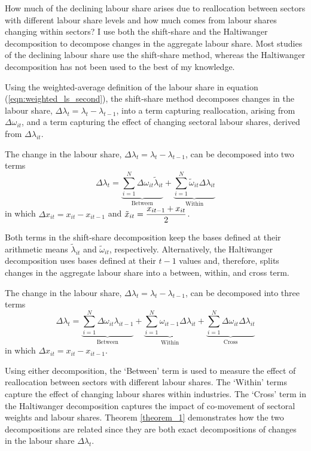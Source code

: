 How much of the declining labour share arises due to reallocation between sectors with different labour share levels and how much comes from labour shares changing within sectors? I use both the shift-share and the Haltiwanger decomposition to decompose changes in the aggregate labour share. Most studies of the declining labour share use the shift-share method, whereas the Haltiwanger decomposition has not been used to the best of my knowledge.  

Using the weighted-average definition of the labour share in equation (\ref{eqn:weighted_ls_second}), the shift-share method decomposes changes in the labour share, $\Delta \lambda_{t} = \lambda_{t} - \lambda_{t-1}$, into a term capturing reallocation, arising from $\Delta\omega_{it}$, and a term capturing the effect of changing sectoral labour shares, derived from $\Delta\lambda_{it}$.
\begin{definition}
    The change in the labour share, $\Delta \lambda_{t} = \lambda_{t} - \lambda_{t-1}$, can be decomposed into two terms
    \begin{equation}
        \Delta \lambda_{t} = \underbrace{\sum_{i=1}^{N}\Delta\omega_{it}\tilde{\lambda}_{it}}_\text{Between} + \underbrace{\sum_{i=1}^{N}\tilde{\omega}_{it}\Delta\lambda_{it}}_\text{Within} 
    \label{eqn:shift_share_decomposition}
    \end{equation}    
    in which $\Delta x_{it} = x_{it} - x_{it-1}$ and $\tilde{x}_{it} = {\displaystyle\frac{\displaystyle x_{it-1} + x_{it}}{\displaystyle 2}}$.
\end{definition}
\noindent Both terms in the shift-share decomposition keep the bases defined at their arithmetic means $\tilde{\lambda}_{it}$ and $\tilde{\omega}_{it}$, respectively. Alternatively, the Haltiwanger decomposition uses bases defined at their $t-1$ values and, therefore, splits changes in the aggregate labour share into a between, within, and cross term. 

\begin{definition}
    The change in the labour share, $\Delta \lambda_{t} = \lambda_{t} - \lambda_{t-1}$, can be decomposed into three terms
    \begin{equation}
        \Delta \lambda_{t} = \underbrace{\sum_{i=1}^{N}\Delta\omega_{it}\lambda_{it-1}}_\text{Between} + \underbrace{\sum_{i=1}^{N}\omega_{it-1}\Delta\lambda_{it}}_\text{Within} + \underbrace{\sum_{i=1}^{N}\Delta\omega_{it}\Delta\lambda_{it}}_\text{Cross}
    \label{eqn:haltiwanger_decomposition}
    \end{equation}
    in which $\Delta x_{it} = x_{it} - x_{it-1}$.
\end{definition}
\noindent Using either decomposition, the `Between' term is used to measure the effect of reallocation between sectors with different labour shares. The `Within' terms capture the effect of changing labour shares within industries. The `Cross' term in the Haltiwanger decomposition captures the impact of co-movement of sectoral weights and labour shares. Theorem \ref{theorem_1} demonstrates how the two decompositions are related since they are both exact decompositions of changes in the labour share $\Delta\lambda_{t}$. 

